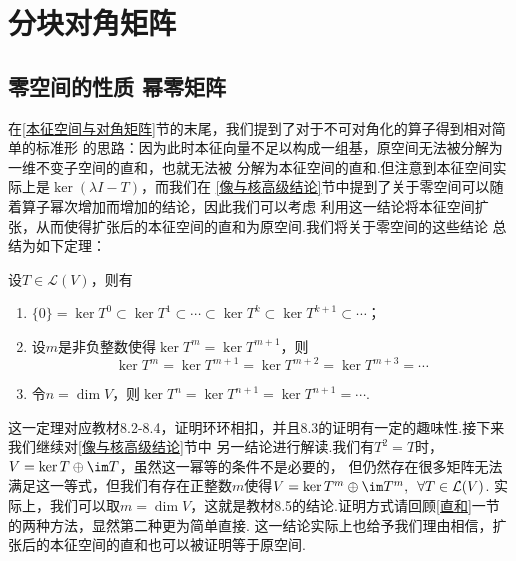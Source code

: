 \section{分块对角矩阵}
\subsection{零空间的性质 \quad 幂零矩阵}
在\ref{本征空间与对角矩阵}节的末尾，我们提到了对于不可对角化的算子得到相对简单的标准形
的思路：因为此时本征向量不足以构成一组基，原空间无法被分解为一维不变子空间的直和，也就无法被
分解为本征空间的直和.但注意到本征空间实际上是$\ker (\lambda I-T)$，而我们在
\ref{像与核高级结论}节中提到了关于零空间可以随着算子幂次增加而增加的结论，因此我们可以考虑
利用这一结论将本征空间扩张，从而使得扩张后的本征空间的直和为原空间.我们将关于零空间的这些结论
总结为如下定理：
\begin{theorem}\label{th:16:kernel}
    设$T\in \mathcal{L}(V)$，则有
    \begin{enumerate}
        \item $\{0\}=\ker T^0\subset\ker T^1\subset\cdots\subset
        \ker T^k\subset\ker T^{k+1}\subset\cdots$；

        \item 设$m$是非负整数使得$\ker T^m=\ker T^{m+1}$，则
        \[\ker T^m=\ker T^{m+1}=\ker T^{m+2}=\ker T^{m+3}=\cdots\]

        \item 令$n=\dim V$，则$\ker T^n=\ker T^{n+1}=\ker T^{n+1}=\cdots$.
    \end{enumerate}
\end{theorem}
这一定理对应教材8.2-8.4，证明环环相扣，并且8.3的证明有一定的趣味性.接下来我们继续对\ref{像与核高级结论}节中
另一结论进行解读.我们有$T^2=T$时，$V=\ker T\oplus\im T$，虽然这一幂等的条件不是必要的，
但仍然存在很多矩阵无法满足这一等式，但我们有存在正整数$m$使得$V=\ker T^m\oplus\im T^m,\enspace\forall T\in \mathcal{L}(V)$.
实际上，我们可以取$m=\dim V$，这就是教材8.5的结论.证明方式请回顾\ref{直和}一节的两种方法，显然第二种更为简单直接.
这一结论实际上也给予我们理由相信，扩张后的本征空间的直和也可以被证明等于原空间.

